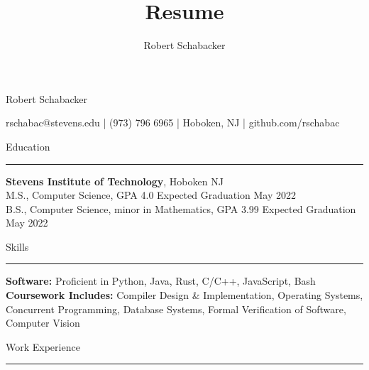 \documentclass{article}
\title{Resume}
\author{Robert Schabacker}
\newcommand \spacingBetweenHeadings {0.3em}
\newcommand \spacingAfterHeadings {0.5em}
\begin{document}
\begin{center}
{\huge Robert Schabacker\par}
\vspace{0.3em}
{\Large rschabac@stevens.edu  |  (973) 796 6965  |  Hoboken, NJ  |  github.com/rschabac\par}
\end{center}
\vspace{-1.3em}
\vspace{\spacingBetweenHeadings}

\noindent
\huge Education\par
\vspace{0.1em}
\hrule
\Large
\vspace{\spacingAfterHeadings}
\noindent
\textbf{Stevens Institute of Technology}, Hoboken NJ\\
M.S., Computer Science, GPA 4.0
\hfill
Expected Graduation May 2022\\
B.S., Computer Science, minor in Mathematics, GPA 3.99
\hfill
Expected Graduation May 2022



\vspace{\spacingBetweenHeadings}

\noindent
\huge Skills\par
\vspace{0.1em}
\hrule
\Large
\vspace{\spacingAfterHeadings}
\noindent
\textbf{Software:} Proficient in Python, Java, Rust, C/C++, JavaScript, Bash\\
\textbf{Coursework Includes:} Compiler Design \& Implementation, Operating Systems, Concurrent Programming, Database Systems, Formal Verification of Software, Computer Vision %


\vspace{\spacingBetweenHeadings}

\noindent
\huge Work Experience\par
\vspace{0.1em}
\hrule
\Large
\vspace{\spacingAfterHeadings}
\end{document}
